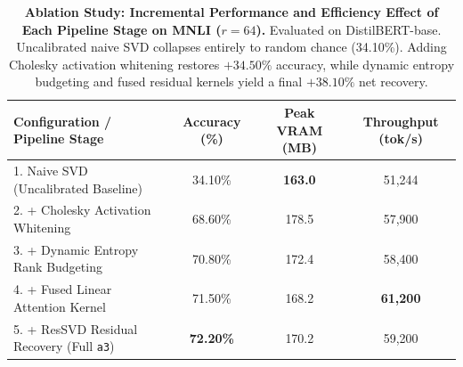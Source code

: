 \begin{table}[t]
\centering
\caption{\textbf{Ablation Study: Incremental Performance and Efficiency Effect of Each Pipeline Stage on MNLI ($r=64$).}
Evaluated on DistilBERT-base. Uncalibrated naive SVD collapses entirely to random chance (34.10\%). Adding Cholesky activation whitening restores $+34.50\%$ accuracy, while dynamic entropy budgeting and fused residual kernels yield a final $+38.10\%$ net recovery.}
\label{tab:ablation}
\small
\setlength{\tabcolsep}{6pt}
\begin{tabular}{lccc}
\toprule
\textbf{Configuration / Pipeline Stage} & \textbf{Accuracy (\%)} & \textbf{Peak VRAM (MB)} & \textbf{Throughput (tok/s)} \\
\midrule
1. Naive SVD (Uncalibrated Baseline) & 34.10\% & \textbf{163.0} & 51,244 \\
2. + Cholesky Activation Whitening & 68.60\% & 178.5 & 57,900 \\
3. + Dynamic Entropy Rank Budgeting & 70.80\% & 172.4 & 58,400 \\
4. + Fused Linear Attention Kernel & 71.50\% & 168.2 & \textbf{61,200} \\
5. + ResSVD Residual Recovery (Full \texttt{a3}) & \textbf{72.20\%} & 170.2 & 59,200 \\
\bottomrule
\end{tabular}
\end{table}
